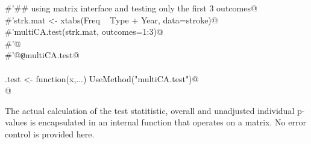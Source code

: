 \documentclass[reqno]{amsart}
\begin{document}
\begin{flushleft}
\begin{minipage}{\linewidth}
\begin{list}{}{}
\mbox{}\verb@#'## using matrix interface and testing only the first 3 outcomes@\\
\mbox{}\verb@#'strk.mat <- xtabs(Freq ~ Type + Year, data=stroke)@\\
\mbox{}\verb@#'multiCA.test(strk.mat, outcomes=1:3)@\\
\mbox{}\verb@#'@\\
\mbox{}\verb@#'@{\tt @}\verb@name multiCA.test@\\
\mbox{}\verb@@\\
\mbox{}\verb@multiCA.test <- function(x,...) UseMethod("multiCA.test")@\\
\mbox{}\verb@ @\\
\mbox{}\verb@@{\NWsep}
\end{list}
\vspace{-1.5ex}
\footnotesize
\begin{list}{}{\setlength{\itemsep}{-\parsep}\setlength{\itemindent}{-\leftmargin}}

\item{}
\end{list}
\end{minipage}\vspace{4ex}
\end{flushleft}
The actual calculation of the test statitistic, overall and unadjusted individual p-values is encapsulated in an internal function that operates on a matrix. No error control is provided here.
\end{document}
